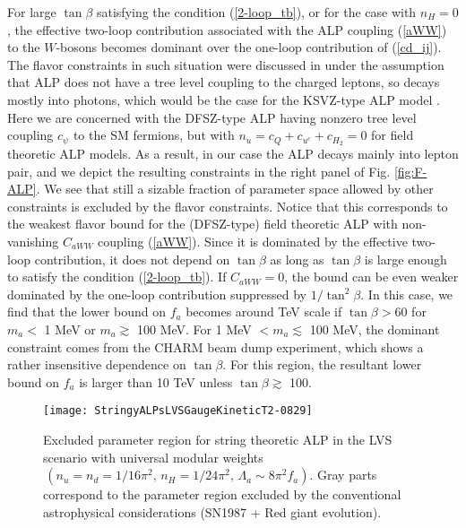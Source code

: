 \documentclass[preprint,prd,aps,tighten,nofootinbib,amssymb]{revtex4}
\def\vpq{f_{a}}
\begin{document}
For  large $\tan \beta$ satisfying the condition (\ref{2-loop_tb}), or for the case with $n_H=0$, the effective two-loop  contribution associated with the ALP coupling (\ref{aWW})  to the $W$-bosons becomes dominant over the one-loop contribution of (\ref{cd_ij}). 
The flavor constraints in such situation  were discussed in \cite{Izaguirre:2016dfi} under the assumption that ALP does not have a tree level coupling to the charged leptons, so decays mostly into photons, which would be the case  for the KSVZ-type ALP model \cite{Kim:2008hd}.
Here  we are concerned with the DFSZ-type ALP having nonzero tree level coupling $c_\psi$ to the SM fermions, but with $n_u=c_Q+c_{u^c}+c_{H_2}=0$ for field theoretic ALP models.   As a result, in our case the ALP decays mainly  into  lepton pair, and we depict the resulting constraints in the right panel of Fig. \ref{fig:F-ALP}. 
We see that still a sizable fraction of parameter space allowed by other constraints is excluded by the flavor constraints.
Notice that this corresponds to the weakest flavor bound for the (DFSZ-type) field theoretic ALP with non-vanishing $C_{aWW}$ coupling (\ref{aWW}).
Since it is dominated by the effective two-loop contribution, it does not depend on $\tan \beta$ as long as $\tan \beta$ is large enough to satisfy the condition (\ref{2-loop_tb}). 
If $C_{aWW}=0$, the bound can be even weaker dominated by the one-loop contribution suppressed by $1/\tan^2 \beta$. In this case, we find that the lower bound on $\vpq$ becomes around TeV scale if $\tan \beta > 60$ 
for $m_a < $ 1 MeV or $m_a \gtrsim$ 100 MeV. For 1 MeV $ < m_a \lesssim $ 100 MeV, the dominant constraint comes from the CHARM beam dump experiment, which shows
a rather insensitive dependence on $\tan \beta$. For this region, the resultant lower bound on $\vpq$ is larger than 10 TeV unless $\tan \beta \gtrsim$ 100. 

\begin{figure}
\begin{center}
\texttt{[image: StringyALPsLVSGaugeKineticT2-0829]}
\caption{Excluded parameter region for string theoretic ALP in the LVS scenario with universal modular weights $ \,(n_u=n_d=1/16\pi^2,\, n_H=1/24\pi^2, \, \Lambda_a\sim 8\pi^2 f_a)$.
Gray parts correspond to the parameter region excluded by the conventional astrophysical considerations (SN1987 + Red giant evolution). 
}
\label{fig:S-ALP}
\end{center}
\end{figure}
\end{document}
